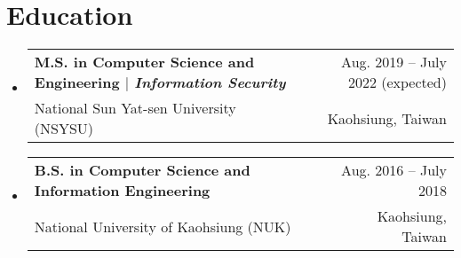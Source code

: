 \documentclass[A4,11pt]{article}
\makeatletter
\newcommand{\CVSubheading}[4]{
  \vspace{-2pt}\item
    \begin{tabular*}{0.97\textwidth}[t]{l@{\extracolsep{\fill}}r}
      \textbf{#1} & #2 \\
      \small#3 & \small #4 \\
    \end{tabular*}\vspace{-7pt}
}
\newcommand{\CVSubHeadingListStart}{\begin{itemize}[leftmargin=0.5cm, label={}]}
\newcommand{\CVSubHeadingListEnd}{\end{itemize}}
\makeatother
\begin{document}
\begin{comment}
This CV was written for specifically for positions I was applying for in
academia, and then modified to be a template.

A standard CV is about two pages long where as a resume in the US is one page.
sections can be added and removed here with this in mind. In my experience, 
education, and applicable work experience and skills are the most import things
to include on a resume. For a CV the Europass CV suggests the categories: Work
Experience, Education and Training, Language Skills, Digital Skills,
Communication and Interpersonal Skills, Conferences and Seminars, Creative Works
Driver's License, Hobbies and Interests, Honors and Awards, Management and
Leadership Skills, Networks and Memberships, Organizational Skills, Projects,
Publications, Recommendations, Social and Political Activities, Volunteering.

Your goal is to convey a who, what , when, where, why for every item you share. 
The who is obviously you, but I believe the rest should be done in that order.
For example below. An employer cares most about the degree held and typically 
less about the institution or where it is located (This is still good 
information though). Whatever order you choose be consistent throughout.
\end{comment}

\section{Education}
  \CVSubHeadingListStart
    \CVSubheading
      {M.S. in Computer Science and Engineering $|$ \emph{\small{Information Security}}}{Aug. 2019 -- July 2022 (expected)}
      {National Sun Yat-sen University (NSYSU)}{Kaohsiung, Taiwan}
    \CVSubheading
      {B.S. in Computer Science and Information Engineering}{Aug. 2016 -- July 2018}
      {National University of Kaohsiung (NUK)}{Kaohsiung, Taiwan}
  \CVSubHeadingListEnd

\begin{comment}
  try to briefly explain what you did and why it is relevant to the position you
  are seeking
  \end{comment}
  
\end{document}
